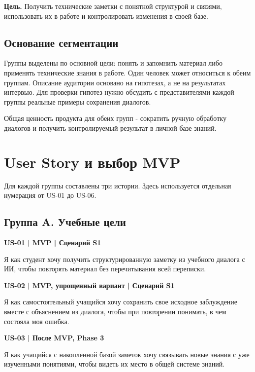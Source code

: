 \textbf{Цель.} Получить технические заметки с понятной структурой и связями, использовать их в работе и контролировать изменения в своей базе.


\subsection{Основание сегментации}

Группы выделены по основной цели: понять и запомнить материал либо применять технические знания в работе. Один человек может относиться к обеим группам. Описание аудитории основано на гипотезах, а не на результатах интервью. Для проверки гипотез нужно обсудить с представителями каждой группы реальные примеры сохранения диалогов.


Общая ценность продукта для обеих групп - сократить ручную обработку диалогов и получить контролируемый результат в личной базе знаний.



\clearpage
\section{User Story и выбор MVP}

Для каждой группы составлены три истории. Здесь используется отдельная нумерация от US-01 до US-06.


\subsection{Группа A. Учебные цели}

\textbf{US-01 | MVP | Сценарий S1}

\nopagebreak[4]

Я как студент хочу получить структурированную заметку из учебного диалога с ИИ, чтобы повторять материал без перечитывания всей переписки.


\textbf{US-02 | MVP, упрощенный вариант | Сценарий S1}

\nopagebreak[4]

Я как самостоятельный учащийся хочу сохранить свое исходное заблуждение вместе с объяснением из диалога, чтобы при повторении понимать, в чем состояла моя ошибка.


\textbf{US-03 | После MVP, Phase 3}

\nopagebreak[4]

Я как учащийся с накопленной базой заметок хочу связывать новые знания с уже изученными понятиями, чтобы видеть их место в общей системе знаний.


